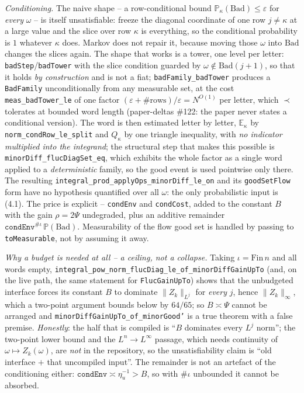 \begin{theorem}
  \emph{Conditioning.}  The naive shape -- a row-conditional bound
  $\mathbb P_\kappa(\mathrm{Bad})\le\varepsilon$ for \emph{every} $\omega$ -- is itself
  unsatisfiable: freeze the diagonal coordinate of one row $j\ne\kappa$ at a large value and the
  slice over row $\kappa$ is everything, so the conditional probability is $1$ whatever $\kappa$
  does.  Markov does not repair it, because moving those $\omega$ into $\mathrm{Bad}$ changes the
  slices again.  The shape that works is a tower, one level per letter:
  \texttt{badStep}/\texttt{badTower} with the slice condition guarded by
  $\omega\notin\mathrm{Bad}(j+1)$, so that it holds \emph{by construction} and is not a fiat;
  \texttt{badFamily\_badTower} produces a \texttt{BadFamily} unconditionally from any measurable
  set, at the cost \texttt{meas\_badTower\_le} of one factor $(\varepsilon+\#\mathrm{rows})
  /\varepsilon=N^{O(1)}$ per letter, which $\prec$ tolerates at bounded word length
  (paper-deltas \#122: the paper never states a conditional version).  The word is
  then estimated letter by letter, $\mathbb E_\kappa$ by \texttt{norm\_condRow\_le\_split} and
  $Q_\kappa$ by one triangle inequality, with \emph{no indicator multiplied into the integrand};
  the structural step that makes this possible is
  \texttt{minorDiff\_flucDiagSet\_eq}, which exhibits the whole factor as a single word applied to
  a \emph{deterministic} family, so the good event is used pointwise only there.  The resulting
  \texttt{integral\_prod\_applyOps\_minorDiff\_le\_on} and its
  \texttt{goodSetFlow} form have no hypothesis quantified over all $\omega$: the only
  probabilistic input is (4.1).  The price is explicit -- \texttt{condEnv} and \texttt{condCost},
  added to the constant $B$ with the gain $\rho=2\Psi$ undegraded, plus an additive remainder
  $\texttt{condEnv}^{\#\iota}\,\mathbb P(\mathrm{Bad})$.  Measurability of the flow good set is
  handled by passing to \texttt{toMeasurable}, not by assuming it away.

  \emph{Why a budget is needed at all -- a ceiling, not a collapse.}  Taking $\iota=\mathrm{Fin}\,n$
  and all words empty, \texttt{integral\_pow\_norm\_flucDiag\_le\_of\_minorDiffGainUpTo} (and,
  on the live path, the same statement for \texttt{FlucGainUpTo}) shows that the unbudgeted
  interface forces its constant $B$ to dominate $\|Z_k\|_{L^j}$ for \emph{every} $j$, hence
  $\|Z_k\|_\infty$, which a two-point argument bounds below by $64/65$; so $B\asymp\Psi$ cannot be
  arranged and \texttt{minorDiffGainUpTo\_of\_minorGood'} is a true theorem with a false premise.
  \emph{Honestly}: the half that is compiled is ``$B$ dominates every $L^j$ norm'';
  the two-point lower bound and the $L^n\to L^\infty$ passage, which needs continuity of
  $\omega\mapsto Z_k(\omega)$, are \emph{not} in the repository, so the unsatisfiability claim is
  ``old interface $+$ that uncompiled input''.  The remainder is not an artefact of the
  conditioning either: $\texttt{condEnv}\asymp\eta_u^{-1}>B$, so with $\#\iota$ unbounded it
  cannot be absorbed.


\end{theorem}
